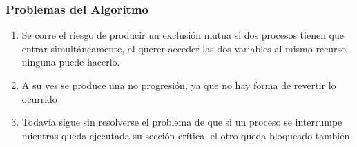 \documentclass{beamer}
\begin{document}
\begin{frame}

\frametitle{Problemas del Algoritmo}
\begin{enumerate}[$*$]
\item Se corre el riesgo de producir un exclusión mutua si dos procesos tienen que entrar simultáneamente, al querer 
acceder las dos variables al mismo recurso ninguna puede hacerlo.
\item A su ves se produce una no progresión, ya que no hay forma de revertir lo ocurrido
\item Todavía sigue sin resolverse el problema de que si un proceso se interrumpe mientras queda 
ejecutada su sección crítica, el otro queda bloqueado también.
\end{enumerate}

\end{frame}
\end{document}

